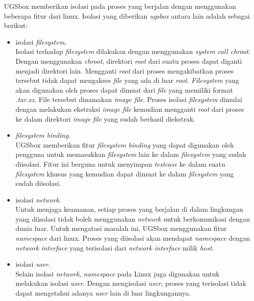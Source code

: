 \par UGSbox memberikan isolasi pada proses yang berjalan dengan menggunakan beberapa fitur dari linux. Isolasi yang diberikan \textit{ugsbox} antara lain adalah sebagai berikut:
\begin{itemize}
    \item isolasi \textit{filesystem}. \\ Isolasi terhadap \textit{filesystem} dilakukan dengan menggunakan \textit{system call chroot}. Dengan menggunakan \textit{chroot}, direktori \textit{root} dari suatu  proses dapat diganti menjadi direktori lain. Mengganti \textit{root} dari proses mengakibatkan proses tersebut tidak dapat mengakses \textit{file} yang ada di luar \textit{root}. \textit{Filesystem} yang akan digunakan oleh proses dapat dimuat dari \textit{file} yang memiliki format \textit{.tar.xz}. File tersebut dinamakan \textit{image file}. Proses isolasi \textit{filesystem} dimulai dengan melakukan ekstraksi \textit{image file} kemudian mengganti \textit{root} dari proses ke dalam direktori \textit{image file} yang sudah berhasil diekstrak. 

    \item \textit{filesystem binding}. \\ UGSbox memberikan fitur \textit{filesystem binding} yang dapat digunakan oleh pengguna untuk memasukkan \textit{filesystem} lain ke dalam \textit{filesystem} yang sudah diisolasi. Fitur ini berguna untuk menyimpan \textit{testcase} ke dalam suatu \textit{filesystem} khusus yang kemudian dapat dimuat ke dalam \textit{filesystem} yang sudah diisolasi.

    \item isolasi \textit{network}. \\ Untuk menjaga keamanan, setiap proses yang berjalan di dalam lingkungan yang diisolasi tidak boleh menggunakan \textit{network} untuk berkomunikasi dengan dunia luar. Untuk mengatasi masalah ini, UGSbox menggunakan fitur \textit{namespace} dari linux. Proses yang diisolasi akan mendapat \textit{namespace} dengan \textit{network interface} yang terisolasi dari \textit{network interface} milik \textit{host}.

    \item isolasi \textit{user}. \\ Selain isolasi \textit{network}, \textit{namespace} pada Linux juga digunakan untuk melakukan isolasi \textit{user}. Dengan mengisolasi \textit{user}, proses yang terisolasi tidak dapat mengetahui adanya \textit{user} lain di luar lingkungannya.


\end{itemize}
